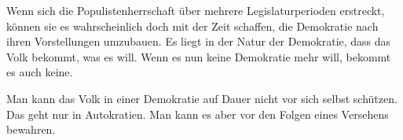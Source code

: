 Wenn sich die Populistenherrschaft über mehrere Legislaturperioden erstreckt, können sie es wahrscheinlich doch mit der Zeit schaffen, die Demokratie nach ihren Vorstellungen umzubauen.
Es liegt in der Natur der Demokratie, dass das Volk bekommt, was es will.
Wenn es nun keine Demokratie mehr will, bekommt es auch keine.

Man kann das Volk in einer Demokratie auf Dauer nicht vor sich selbst schützen.
Das geht nur in Autokratien.
Man kann es aber vor den Folgen eines Versehens bewahren.
